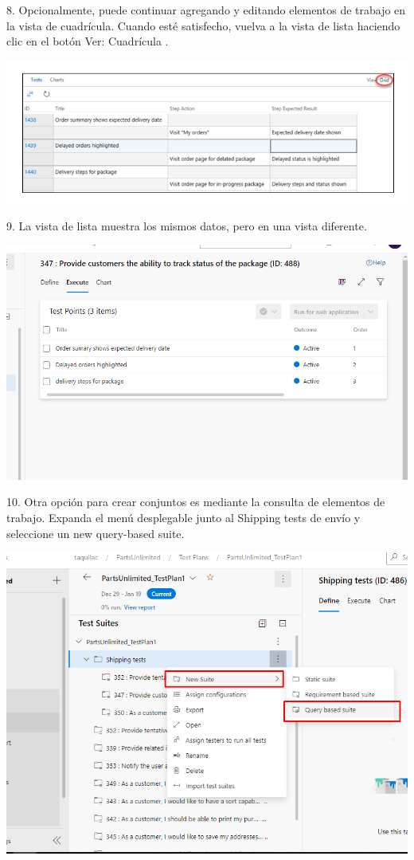 \documentclass[12pt,letterpaper]{article}
\begin{document}
8. Opcionalmente, puede continuar agregando y editando elementos de trabajo en la vista de cuadrícula. Cuando esté satisfecho, vuelva a la vista de lista haciendo clic en el botón Ver: Cuadrícula .

\begin{center}
		\includegraphics[width=15cm]{./Imagenes/39} 
\end{center}

9. La vista de lista muestra los mismos datos, pero en una vista diferente.

\begin{center}
		\includegraphics[width=15cm]{./Imagenes/36} 
\end{center}

10. Otra opción para crear conjuntos es mediante la consulta de elementos de trabajo. Expanda el menú desplegable junto al  Shipping tests de envío y seleccione un new query-based suite.

\begin{center}
		\includegraphics[width=15cm]{./Imagenes/37} 
\end{center}
\end{document}
